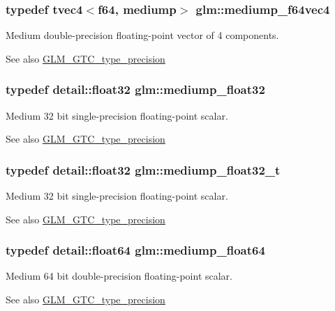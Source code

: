 \subsubsection[{mediump\+\_\+f64vec4}]{\setlength{\rightskip}{0pt plus 5cm}typedef tvec4$<${\bf f64}, mediump$>$ {\bf glm\+::mediump\+\_\+f64vec4}}\label{namespaceglm_ae20b112098e50234ede09f15028b9749}
Medium double-\/precision floating-\/point vector of 4 components. \begin{DoxySeeAlso}{See also}
\hyperlink{group__gtc__type__precision}{G\+L\+M\+\_\+\+G\+T\+C\+\_\+type\+\_\+precision} 
\end{DoxySeeAlso}
\hypertarget{namespaceglm_a1b5f74cbeed0c9d42cd57d77609be7ee}{}
\subsubsection[{mediump\+\_\+float32}]{\setlength{\rightskip}{0pt plus 5cm}typedef detail\+::float32 {\bf glm\+::mediump\+\_\+float32}}\label{namespaceglm_a1b5f74cbeed0c9d42cd57d77609be7ee}
Medium 32 bit single-\/precision floating-\/point scalar. \begin{DoxySeeAlso}{See also}
\hyperlink{group__gtc__type__precision}{G\+L\+M\+\_\+\+G\+T\+C\+\_\+type\+\_\+precision} 
\end{DoxySeeAlso}
\hypertarget{namespaceglm_acbd406715148db96c9d9d2a2ef6460de}{}
\subsubsection[{mediump\+\_\+float32\+\_\+t}]{\setlength{\rightskip}{0pt plus 5cm}typedef detail\+::float32 {\bf glm\+::mediump\+\_\+float32\+\_\+t}}\label{namespaceglm_acbd406715148db96c9d9d2a2ef6460de}
Medium 32 bit single-\/precision floating-\/point scalar. \begin{DoxySeeAlso}{See also}
\hyperlink{group__gtc__type__precision}{G\+L\+M\+\_\+\+G\+T\+C\+\_\+type\+\_\+precision} 
\end{DoxySeeAlso}
\hypertarget{namespaceglm_a9225ae6aed0f90b6eb65bf8d466199c1}{}
\subsubsection[{mediump\+\_\+float64}]{\setlength{\rightskip}{0pt plus 5cm}typedef detail\+::float64 {\bf glm\+::mediump\+\_\+float64}}\label{namespaceglm_a9225ae6aed0f90b6eb65bf8d466199c1}
Medium 64 bit double-\/precision floating-\/point scalar. \begin{DoxySeeAlso}{See also}
\hyperlink{group__gtc__type__precision}{G\+L\+M\+\_\+\+G\+T\+C\+\_\+type\+\_\+precision} 
\end{DoxySeeAlso}
\hypertarget{namespaceglm_a97a0747b103eb5ef320a91888de52f51}{}
